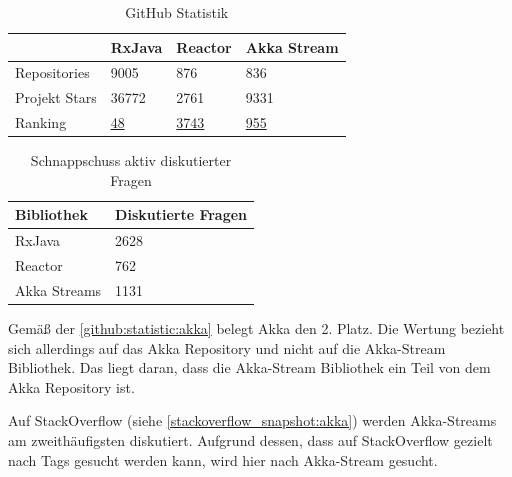 \subsubsection{\criteriaVerbreitung}
\begin{table}[H]
\caption{GitHub Statistik}
\centering
\begin{tabular}{l|l|l|l|}
\cline{2-4}
              & \cellcolor[HTML]{00A99D}RxJava & \cellcolor[HTML]{00A99D}Reactor & \cellcolor[HTML]{00A99D}Akka Stream \\ \hline
\multicolumn{1}{|l|}{\cellcolor[HTML]{00A99D}Repositories}  & 9005                          & 876                             & 836                                \\ \hline
\multicolumn{1}{|l|}{\cellcolor[HTML]{00A99D}Projekt Stars} & 36772                         & 2761                            & 9331                               \\ \hline
\multicolumn{1}{|l|}{\cellcolor[HTML]{00A99D}Ranking}		  & \href{https://gitstar-ranking.com/ReactiveX/RxJava}{48}							   & \href{https://gitstar-ranking.com/reactor/reactor}{3743}							 & \href{https://gitstar-ranking.com/akka/akka}{955}								   \\ \hline
\end{tabular}
\label{github:statistic:akka}
\end{table}

\begin{table}[H]
\centering
\caption{Schnappschuss aktiv diskutierter Fragen}
\begin{tabular}{|l|l|}
\hline
\rowcolor[HTML]{00A99D} 
Bibliothek   & Diskutierte Fragen \\ \hline
RxJava       & 2628   \\ \hline
Reactor     & 762    \\ \hline
Akka Streams & 1131   \\ \hline
\end{tabular}
\label{stackoverflow_snapshot:akka}
\end{table}

Gemäß der \autoref{github:statistic:akka} belegt Akka den 2. Platz. Die Wertung bezieht sich allerdings auf das Akka Repository und nicht auf die Akka-Stream Bibliothek. Das liegt daran, dass die Akka-Stream Bibliothek ein Teil von dem Akka Repository ist.

Auf StackOverflow (siehe \autoref{stackoverflow_snapshot:akka}) werden Akka-Streams am zweithäufigsten diskutiert. Aufgrund dessen, dass auf StackOverflow gezielt nach Tags gesucht werden kann, wird hier nach Akka-Stream gesucht.

